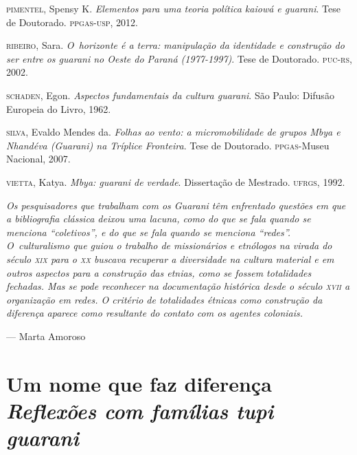 \begin{Parskip}
\textsc{pimentel}, Spensy K. \emph{Elementos para uma teoria política kaiowá e guarani}.
 Tese de Doutorado. \textsc{ppgas}-\textsc{usp}, 2012.

\textsc{ribeiro}, Sara. \emph{O~horizonte é a terra: manipulação da
identidade e construção do ser entre os guarani no Oeste do Paraná
(1977-1997)}. Tese de Doutorado. \textsc{puc}-\textsc{rs}, 2002.

\textsc{schaden}, Egon. \emph{Aspectos fundamentais da cultura guarani}. São Paulo:
Difusão Europeia do Livro, 1962.

\textsc{silva}, Evaldo Mendes da. \emph{Folhas ao vento: a micromobilidade de grupos
Mbya e Nhandéva (Guarani) na Tríplice Fronteira}. Tese de Doutorado. \textsc{ppgas}-Museu Nacional, 2007.

\textsc{vietta}, Katya. \emph{Mbya: guarani de verdade}. Dissertação de Mestrado. \textsc{ufrgs}, 1992.
\end{Parskip}

\clearpage

\vspace*{\fill}

\begin{flushright}
\begin{minipage}[c]{0.85\textwidth}
\raggedleft
\footnotesize
\emph{Os pesquisadores que trabalham com os Guarani têm enfrentado questões em
que a bibliografia clássica deixou uma lacuna, como do que se fala
quando se menciona ``coletivos'', e do que se fala quando se menciona
``redes''. O~culturalismo que guiou o trabalho de missionários e etnólogos
na virada do século \textsc{xix} para o \textsc{xx} buscava recuperar a diversidade na
cultura material e em outros aspectos para a construção das etnias,
como se fossem totalidades fechadas. Mas se pode reconhecer na
documentação histórica desde o século \textsc{xvii} a organização em redes. O
critério de totalidades étnicas como construção da diferença aparece
como resultante do contato com os agentes coloniais.}

\smallskip
\hspace*{\fill}--- Marta Amoroso
\end{minipage}
\end{flushright}

\thispagestyle{empty}

\chapter*{Um nome que faz diferença\\
\large{\emph{Reflexões com famílias tupi guarani}}}

